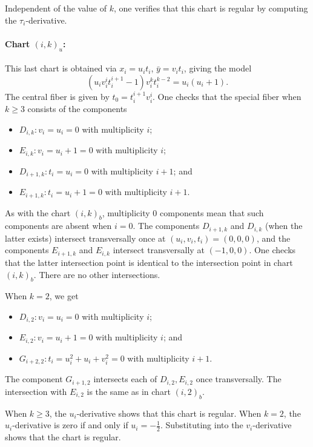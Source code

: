 \documentclass[reqno]{amsart}
\theoremstyle{definition}
\theoremstyle{remark}
\newcommand{\sy}{\bar{y}}
\begin{document}
Independent of the value of $k$, one verifies that this chart is regular by computing the $\tau_i$-derivative.

\paragraph{Chart $(i,k)_u$:}
\label{sec:chart-i-k_u}

This last chart is obtained via $x_i = u_it_i$, $\sy = v_it_i$, giving the model
\[
(u_iv_i^it_i^{i+1} - 1) v_i^k t_i^{k-2} = u_i(u_i + 1).
\]
The central fiber is given by $t_0 = t_i^{i+1}v_i^i$. One checks that the special fiber when $k \geq 3$ consists of the components
\begin{itemize}
    \item $D_{i,k}: v_i = u_i = 0$ with multiplicity $i$;
    \item $E_{i,k}: v_i = u_i + 1 = 0$ with multiplicity $i$;
    \item $D_{i+1,k}: t_i = u_i = 0$ with multiplicity $i+1$; and
    \item $E_{i+1,k}: t_i = u_i + 1 = 0$ with multiplicity $i+1$.
\end{itemize}
As with the chart $(i,k)_b$, multiplicity $0$ components mean that such components are absent when $i = 0$.
The components $D_{i+1,k}$ and $D_{i,k}$ (when the latter exists) intersect transversally once at $(u_i, v_i, t_i) = (0,0,0)$, and the components $E_{i+1,k}$ and $E_{i,k}$ intersect transversally at $(-1,0,0)$. One checks that the latter intersection point is identical to the intersection point in chart $(i,k)_b$. There are no other intersections.

When $k = 2$, we get
\begin{itemize}
    \item $D_{i,2}: v_i = u_i = 0$ with multiplicity $i$;
    \item $E_{i,2}: v_i = u_i + 1 = 0$ with multiplicity $i$; and
    \item $G_{i+2,2}: t_i = u_i^2 + u_i + v_i^2 = 0$ with multiplicity $i+1$.
\end{itemize}
The component $G_{i+1,2}$ intersects each of $D_{i,2}, E_{i,2}$ once transversally. The intersection with $E_{i,2}$ is the same as in chart $(i,2)_b$.

When $k \geq 3$, the $u_i$-derivative shows that this chart is regular. When $k = 2$, the $u_i$-derivative is zero if and only if $u_i = -\frac12$. Substituting into the $v_i$-derivative shows that the chart is regular.
\end{document}
